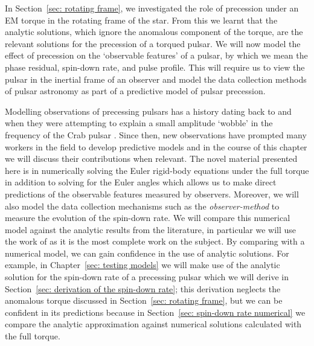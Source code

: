 \documentclass[../full_thesis/full_thesis.tex]{subfiles}
\begin{document}
In Section~\ref{sec: rotating frame}, we investigated the role of precession
under an EM torque in the rotating frame of the star. From this we learnt that
the \citet{Goldreich1970} analytic solutions, which ignore the anomalous
component of the \citet{Deutsch1955} torque, are the relevant solutions for the
precession of a torqued pulsar. We will now model the effect of precession on
the `observable features' of a pulsar, by which we mean the phase residual,
spin-down rate, and pulse profile.  This will require us to view the pulsar in
the inertial frame of an observer and model the data collection methods of
pulsar astronomy as part of a predictive model of pulsar precession.

Modelling observations of precessing pulsars has a history dating back to
\citet{Ruderman1970} and \citet{chiuderi1970shape} when they were attempting to
explain a small amplitude `wobble' in the frequency of the Crab pulsar
\citep{Richards1969, Richards1969b}. Since then, new observations have prompted
many workers in the field to develop predictive models and in the course of
this chapter we will discuss their contributions when relevant.  The novel
material presented here is in numerically solving the Euler rigid-body
equations under the full \citet{Deutsch1955} torque in addition to solving for
the Euler angles which allows us to make direct predictions of the observable
features measured by observers. Moreover, we will also model the data
collection mechanisms such as the \emph{observer-method} to measure the evolution of
the spin-down rate. We will compare this numerical model against the analytic
results from the literature, in particular we will use the work of
\citet{Jones2001} as it is the most complete work on the subject. By comparing
with a numerical model, we can gain confidence in the use of analytic
solutions. For example, in Chapter~\ref{sec: testing models} we will make use
of the analytic solution for the spin-down rate of a precessing pulsar which we
will derive in Section~\ref{sec: derivation of the spin-down rate}; this
derivation neglects the anomalous torque discussed in Section~\ref{sec:
rotating frame}, but we can be confident in its predictions because in
Section~\ref{sec: spin-down rate numerical} we compare the analytic
approximation against numerical solutions calculated with the full torque.
\end{document}
